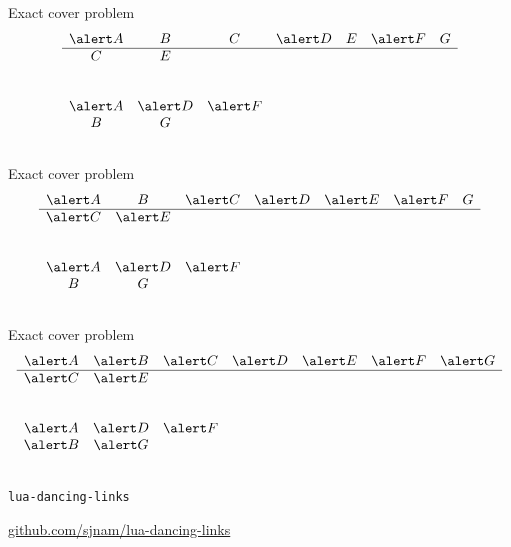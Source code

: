 \documentclass{beamer}
\begin{document}
%
\begin{frame}{Exact cover problem} 
  $$
  \begin{array}{ccccccc}
    \alert A & B & C & \alert D & E & \alert F & G\\
    \hline
    C & E &&&&&\\
    &&&&&&\\
    &&&&&&\\
    \alert A & \alert D & \alert F &&&&\\
    B & G &&&&&\\
    &&&&&&
  \end{array}
  $$
\end{frame}

%
\begin{frame}{Exact cover problem} 
  $$
  \begin{array}{ccccccc}
    \alert A & B & \alert C & \alert D & \alert E & \alert F & G\\
    \hline
    \alert C & \alert E &&&&&\\
    &&&&&&\\
    &&&&&&\\
    \alert A & \alert D & \alert F &&&&\\
    B & G &&&&&\\
    &&&&&&
  \end{array}
  $$
\end{frame}

%
\begin{frame}{Exact cover problem} 
  $$
  \begin{array}{ccccccc}
    \alert A & \alert B & \alert C & \alert D
    & \alert E & \alert F & \alert G\\
    \hline
    \alert C & \alert E &&&&&\\
    &&&&&&\\
    &&&&&&\\
    \alert A & \alert D & \alert F &&&&\\
    \alert B & \alert G &&&&&\\
    &&&&&&
  \end{array}
  $$
\end{frame}

%
\begin{frame}{\texttt{lua-dancing-links}}
\vfill
\begin{center}
\Large
  \href{https://github.com/sjnam/lua-dancing-links}
    {github.com/sjnam/lua-dancing-links}
\end{center}
\vfill
\end{frame}
\end{document}
